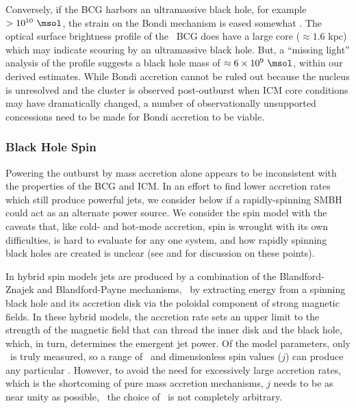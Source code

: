 \documentclass[11pt, preprint]{aastex}
\begin{document}
Conversely, if the BCG harbors an ultramassive black hole, for example
$> 10^{10} ~\msol$, the strain on the Bondi mechanism is eased
somewhat \citep[\eg][]{msspin}. The optical surface brightness profile
of the \rbs\ BCG does have a large core ($\approx 1.6$ kpc) which may
indicate scouring by an ultramassive black hole. But, a ``missing
light'' analysis \citep[see][]{msspin} of the profile suggests a black
hole mass of $\approx 6 \times 10^9 ~\msol$, within our derived
estimates. While Bondi accretion cannot be ruled out because the
nucleus is unresolved and the cluster is observed post-outburst when
ICM core conditions may have dramatically changed, a number of
observationally unsupported concessions need to be made for Bondi
accretion to be viable.

\subsubsection{Black Hole Spin}

Powering the outburst by mass accretion alone appears to be
inconsistent with the properties of the BCG and ICM. In an effort to
find lower accretion rates which still produce powerful jets, we
consider below if a rapidly-spinning SMBH could act as an alternate
power source. We consider the spin model with the caveats that, like
cold- and hot-mode accretion, spin is wrought with its own
difficulties, is hard to evaluate for any one system, and how rapidly
spinning black holes are created is unclear (see \citealt{msspin} and
\citealt{minaspin} for discussion on these points).

In hybrid spin models \citep[\eg][]{1999ApJ...522..753M,
  2001ApJ...548L...9M, 2006ApJ...651.1023R, 2007MNRAS.377.1652N,
  2009MNRAS.397.1302B, gesspin} jets are produced by a combination of
the Blandford-Znajek \citep{bz} and Blandford-Payne \citep{bp}
mechanisms, \ie\ by extracting energy from a spinning black hole and
its accretion disk via the poloidal component of strong magnetic
fields. In these hybrid models, the accretion rate sets an upper limit
to the strength of the magnetic field that can thread the inner disk
and the black hole, which, in turn, determines the emergent jet
power. Of the model parameters, only \pjet\ is truly measured, so a
range of \dme\ and dimensionless spin values ($j$) can produce any
particular \pjet. However, to avoid the need for excessively large
accretion rates, which is the shortcoming of pure mass accretion
mechanisms, $j$ needs to be as near unity as possible, \ie\ the choice
of \dme\ is not completely arbitrary.
\end{document}
